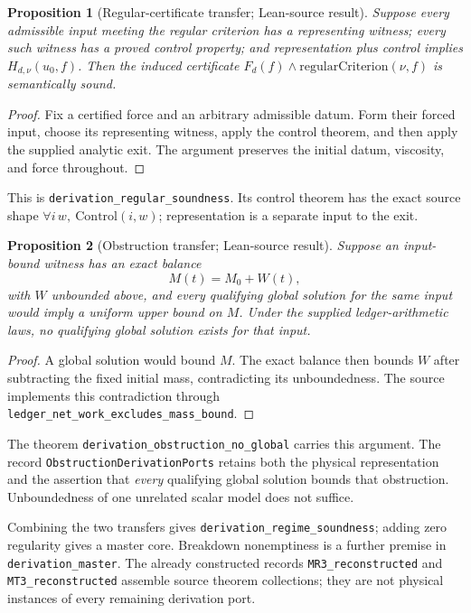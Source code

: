 \documentclass[11pt,a4paper]{article}
\newtheorem{proposition}{Proposition}[section]
\theoremstyle{remark}\newtheorem{remark}[proposition]{Remark}
\newcommand{\code}[1]{\nolinkurl{#1}}
\newcommand{\verified}{\textsf{Lean-source result}}
\begin{document}
\begin{proposition}[Regular-certificate transfer; \verified]
Suppose every admissible input meeting the regular criterion has a representing witness; every such witness has a proved control property; and representation plus control implies $H_{d,\nu}(u_0,f)$. Then the induced certificate $F_d(f)\land\mathrm{regularCriterion}(\nu,f)$ is semantically sound.
\end{proposition}
\begin{proof}
Fix a certified force and an arbitrary admissible datum. Form their forced input, choose its representing witness, apply the control theorem, and then apply the supplied analytic exit. The argument preserves the initial datum, viscosity, and force throughout.
\end{proof}
This is \code{derivation_regular_soundness}. Its control theorem has the exact source shape $\forall i\,w,\ \mathrm{Control}(i,w)$; representation is a separate input to the exit.

\begin{proposition}[Obstruction transfer; \verified]
Suppose an input-bound witness has an exact balance
\[
 M(t)=M_0+W(t),
\]
with $W$ unbounded above, and every qualifying global solution for the same input would imply a uniform upper bound on $M$. Under the supplied ledger-arithmetic laws, no qualifying global solution exists for that input.
\end{proposition}
\begin{proof}
A global solution would bound $M$. The exact balance then bounds $W$ after subtracting the fixed initial mass, contradicting its unboundedness. The source implements this contradiction through \code{ledger_net_work_excludes_mass_bound}.
\end{proof}
The theorem \code{derivation_obstruction_no_global} carries this argument. The record \code{ObstructionDerivationPorts} retains both the physical representation and the assertion that \emph{every} qualifying global solution bounds that obstruction. Unboundedness of one unrelated scalar model does not suffice.

Combining the two transfers gives \code{derivation_regime_soundness}; adding zero regularity gives a master core. Breakdown nonemptiness is a further premise in \code{derivation_master}. The already constructed records \code{MR3_reconstructed} and \code{MT3_reconstructed} assemble source theorem collections; they are not physical instances of every remaining derivation port.
\end{document}
